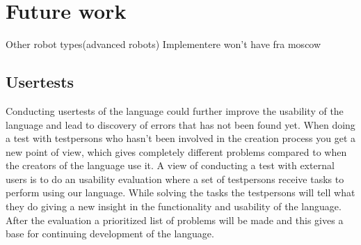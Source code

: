 \chapter{Future work}
Other robot types(advanced robots)
Implementere won't have fra moscow

\section{Usertests}
Conducting usertests of the language could further improve the usability of the language and lead to discovery of errors that has not been found yet. When doing a test with testpersons who hasn't been involved in the creation process you get a new point of view, which gives completely different problems compared to when the creators of the language use it. 
A view of conducting a test with external users is to do an usability evaluation where a set of testpersons receive tasks to perform using our language. While solving the tasks the testpersons will tell what they do giving a new insight in the functionality and usability of the language. 
After the evaluation a prioritized list of problems will be made and this gives a base for continuing development of the language. 